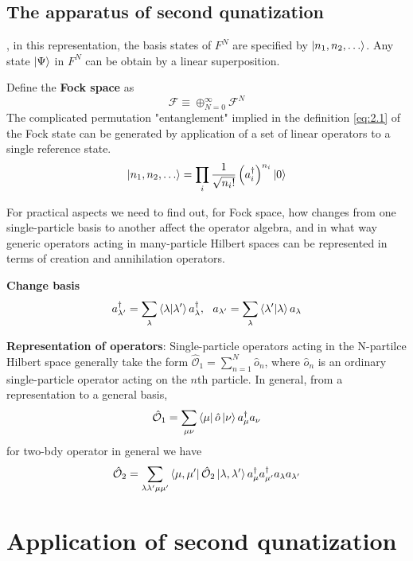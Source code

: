 \subsection{The apparatus of second qunatization}
, in this representation, the basis states of $F^N$ are specified by $\ket{n_1,n_2,\dots}$.
Any state $\ket{\Psi}$ in $F^N$ can be obtain by a linear superposition.

Define the \textbf{Fock space} as
\begin{equation}
    \mathcal{F} \equiv \oplus_{N=0}^\infty \mathcal{F}^N
    \label{eq:2.2}
\end{equation}
The complicated permutation "entanglement" implied in the definition \eqref{eq:2.1} of the Fock state can be generated by application of a set of linear operators to a single reference state.
\begin{equation}
    \ket{n_1, n_2, \dots} = \prod_i \frac{1}{\sqrt{n_i !}} \left( a_i^\dagger \right)^{n_i} \ket{0}
    \label{eq:2.4}
\end{equation}


For practical aspects we need to find out, for Fock space, how changes from one single-particle basis to another affect the operator algebra, and in what way generic operators acting in many-particle Hilbert spaces can be represented in terms of creation and annihilation operators.

\textbf{Change basis}
\begin{equation}
    a^\dagger_{\lambda'} = \sum_\lambda \braket{\lambda}{\lambda'} a^\dagger_\lambda,~ ~  a_{\lambda'} = \sum_\lambda \braket{\lambda'}{\lambda} a_\lambda
    \label{eq:2.8}
\end{equation}

\textbf{Representation of operators}: Single-particle operators acting in the N-partilce Hilbert space generally take the form $\hat{\mathcal{O}}_1 = \sum_{n=1}^N \hat{o}_n$, where $\hat{o}_n$ is an ordinary single-particle operator acting on the $n$th particle.
In general, from a representation to a general basis,
\begin{equation}
    \hat{\mathcal{O}}_1 = \sum_{\mu\nu} \bra{\mu} \hat{o} \ket{\nu} a^\dagger_\mu a_\nu
    \label{eq:2.11}
\end{equation}
for two-bdy operator in general we have
\begin{equation}
    \hat{\mathcal{O}}_2 = \sum_{\lambda\lambda'\mu\mu'} \bra{\mu,\mu'} \hat{\mathcal{O}}_2 \ket{\lambda,\lambda'} a^\dagger_\mu a^\dagger_{\mu'} a_\lambda a_{\lambda'}
    \label{eq:2.16}
\end{equation}

\section{Application of second qunatization}\label{sec:2.2}
